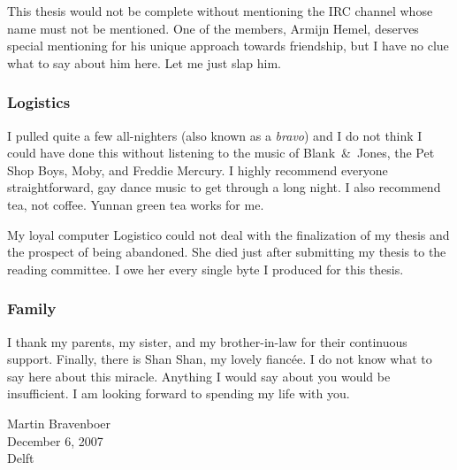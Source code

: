         This thesis would not be complete without mentioning the IRC 
        channel whose name must not be mentioned. One of the members,
        Armijn Hemel, deserves special mentioning for his unique
        approach towards friendship, but I have no clue what to say
        about him here. Let me just slap him.

\subsubsection*{Logistics}

	I pulled quite a few all-nighters (also known as a
        \emph{bravo}) and I do not think I could have done this
        without listening to the music of Blank\ \&\ Jones, the Pet
        Shop Boys, Moby, and Freddie Mercury. I highly recommend
        everyone straightforward, gay dance music to get through a
        long night. I also recommend tea, not coffee. Yunnan green tea
        works for me.
        
        My loyal computer Logistico could not deal with the
        finalization of my thesis and the prospect of being
        abandoned. She died just after submitting my thesis to the
        reading committee. I owe her every single byte I produced for
        this thesis.

\subsubsection*{Family}
        
        I thank my parents, my sister, and my brother-in-law for their
        continuous support. Finally, there is Shan Shan, my lovely
        fianc\'ee. I do not know what to say here about this
        miracle. Anything I would say about you would be
        insufficient. I am looking forward to spending my life with
        you.

\medskip
        
\begin{flushright}
  Martin Bravenboer\\
  December 6, 2007\\
  Delft
\end{flushright}
